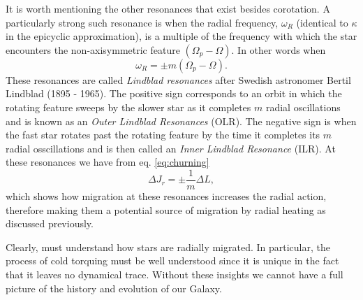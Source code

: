 It is worth mentioning the other resonances that exist besides corotation. A particularly strong such resonance is when the radial frequency, $\omega_R$ (identical to $\kappa$ in the epicyclic approximation), is a multiple of the frequency with which the star encounters the non-axisymmetric feature $(\Omega_p - \Omega)$. In other words when
\begin{equation}
\omega_R = \pm m(\Omega_p - \Omega).
\end{equation}
These resonances are called \textit{Lindblad resonances} after Swedish astronomer Bertil Lindblad (1895 - 1965). The positive sign corresponds to an orbit in which the rotating feature sweeps by the slower star as it completes $m$ radial oscillations and is known as an \textit{Outer Lindblad Resonances} (OLR). The negative sign is when the fast star rotates past the rotating feature by the time it completes its $m$ radial osscillations and is then called an \textit{Inner Lindblad Resonance} (ILR). At these resonances we have from eq. \eqref{eq:churning}
\begin{equation}
    \Delta J_r = \pm \frac{1}{m}\Delta L,
\end{equation}
which shows how migration at these resonances increases the radial action, therefore making them a potential source of migration by radial heating as discussed previously.

Clearly, must understand how stars are radially migrated. In particular, the process of cold torquing must be well understood since it is unique in the fact that it leaves no dynamical trace. Without these insights we cannot have a full picture of the history and evolution of our Galaxy.